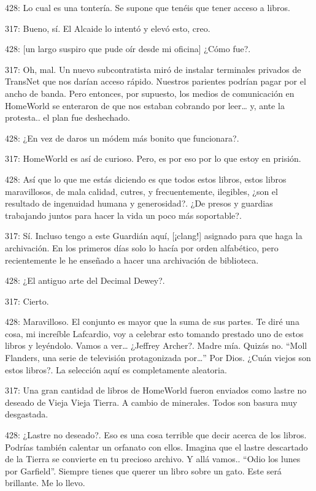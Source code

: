 428: Lo cual es una tontería. Se supone que tenéis que tener acceso a
libros.

317: Bueno, sí. El Alcaide lo intentó y elevó esto, creo.

428: {[}un largo suspiro que pude oír desde mi oficina{]} ¿Cómo fue?.

317: Oh, mal. Un nuevo subcontratista miró de instalar terminales
privados de TransNet que nos darían acceso rápido. Nuestros parientes
podrían pagar por el ancho de banda. Pero entonces, por supuesto, los
medios de comunicación en HomeWorld se enteraron de que nos estaban
cobrando por leer\ldots{} y, ante la protesta.. el plan fue deshechado.

428: ¿En vez de daros un módem más bonito que funcionara?.

317: HomeWorld es así de curioso. Pero, es por eso por lo que estoy en
prisión.

428: Así que lo que me estás diciendo es que todos estos libros, estos
libros maravillosos, de mala calidad, cutres, y frecuentemente,
ilegibles, ¿son el resultado de ingenuidad humana y generosidad?. ¿De
presos y guardias trabajando juntos para hacer la vida un poco más
soportable?.

317: Sí. Incluso tengo a este Guardián aquí, {[}¡clang!{]} asignado para
que haga la archivación. En los primeros días solo lo hacía por orden
alfabético, pero recientemente le he enseñado a hacer una archivación de
biblioteca.

428: ¿El antiguo arte del Decimal Dewey?.

317: Cierto.

428: Maravilloso. El conjunto es mayor que la suma de sus partes. Te
diré una cosa, mi increíble Lafcardio, voy a celebrar esto tomando
prestado uno de estos libros y leyéndolo. Vamos a ver\ldots{} ¿Jeffrey
Archer?. Madre mía. Quizás no. ``Moll Flanders, una serie de televisión
protagonizada por\ldots{}'' Por Dios. ¿Cuán viejos son estos libros?. La
selección aquí es completamente aleatoria.

317: Una gran cantidad de libros de HomeWorld fueron enviados como
lastre no deseado de Vieja Vieja Tierra. A cambio de minerales. Todos
son basura muy desgastada.

428: ¿Lastre no deseado?. Eso es una cosa terrible que decir acerca de
los libros. Podrías también calentar un orfanato con ellos. Imagina que
el lastre descartado de la Tierra se convierte en tu precioso archivo. Y
allá vamos.. ``Odio los lunes por Garfield''. Siempre tienes que querer
un libro sobre un gato. Este será brillante. Me lo llevo.

